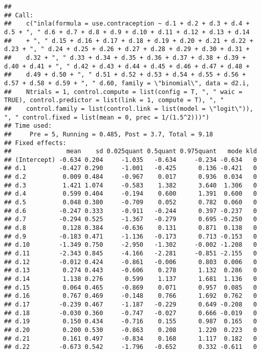 \documentclass[
]{article}
\begin{document}
\begin{verbatim}
## 
## Call:
##    c("inla(formula = use.contraception ~ d.1 + d.2 + d.3 + d.4 + d.5 + ", " d.6 + d.7 + d.8 + d.9 + d.10 + d.11 + d.12 + d.13 + d.14 
##    + ", " d.15 + d.16 + d.17 + d.18 + d.19 + d.20 + d.21 + d.22 + d.23 + ", " d.24 + d.25 + d.26 + d.27 + d.28 + d.29 + d.30 + d.31 + 
##    d.32 + ", " d.33 + d.34 + d.35 + d.36 + d.37 + d.38 + d.39 + d.40 + d.41 + ", " d.42 + d.43 + d.44 + d.45 + d.46 + d.47 + d.48 + 
##    d.49 + d.50 + ", " d.51 + d.52 + d.53 + d.54 + d.55 + d.56 + d.57 + d.58 + d.59 + ", " d.60, family = \"binomial\", data = d2.i, 
##    Ntrials = 1, control.compute = list(config = T, ", " waic = TRUE), control.predictor = list(link = 1, compute = T), ", " 
##    control.family = list(control.link = list(model = \"logit\")), ", " control.fixed = list(mean = 0, prec = 1/(1.5^2)))") 
## Time used:
##     Pre = 5, Running = 0.485, Post = 3.7, Total = 9.18 
## Fixed effects:
##               mean    sd 0.025quant 0.5quant 0.975quant   mode kld
## (Intercept) -0.634 0.204     -1.035   -0.634     -0.234 -0.634   0
## d.1         -0.427 0.290     -1.001   -0.425      0.136 -0.421   0
## d.2          0.009 0.484     -0.967    0.017      0.936  0.034   0
## d.3          1.421 1.074     -0.583    1.382      3.640  1.306   0
## d.4          0.599 0.404     -0.194    0.600      1.391  0.600   0
## d.5          0.048 0.380     -0.709    0.052      0.782  0.060   0
## d.6         -0.247 0.333     -0.911   -0.244      0.397 -0.237   0
## d.7         -0.294 0.525     -1.367   -0.279      0.695 -0.250   0
## d.8          0.128 0.384     -0.636    0.131      0.871  0.138   0
## d.9         -0.183 0.471     -1.136   -0.173      0.713 -0.153   0
## d.10        -1.349 0.750     -2.950   -1.302     -0.002 -1.208   0
## d.11        -2.343 0.845     -4.166   -2.281     -0.851 -2.155   0
## d.12        -0.012 0.424     -0.861   -0.006      0.803  0.006   0
## d.13         0.274 0.443     -0.606    0.278      1.132  0.286   0
## d.14         1.138 0.276      0.599    1.137      1.681  1.136   0
## d.15         0.064 0.465     -0.869    0.071      0.957  0.085   0
## d.16         0.767 0.469     -0.148    0.766      1.692  0.762   0
## d.17        -0.239 0.467     -1.187   -0.229      0.649 -0.208   0
## d.18        -0.030 0.360     -0.747   -0.027      0.666 -0.019   0
## d.19         0.150 0.434     -0.716    0.155      0.987  0.165   0
## d.20         0.200 0.530     -0.863    0.208      1.220  0.223   0
## d.21         0.161 0.497     -0.834    0.168      1.117  0.182   0
## d.22        -0.673 0.542     -1.796   -0.652      0.332 -0.611   0

\end{verbatim}
\end{document}
